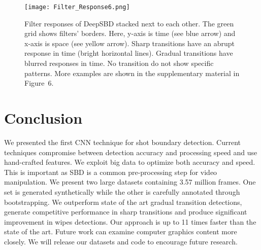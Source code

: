 \documentclass[journal]{IEEEtran}
\begin{document}
\begin{figure}
  \centering
   \texttt{[image: Filter\_Response6.png]}
   \caption{Filter responses of DeepSBD stacked next to each other. The green grid shows filters' borders. Here, y-axis is time (see blue arrow) and x-axis is space (see yellow arrow). Sharp transitions have an abrupt response in time (bright horizontal lines). Gradual transitions have blurred responses in time. No transition do not show specific patterns. More examples are shown in the supplementary material in Figure~6.}
\label{fig:FilterResponses}
 \end{figure}

\section{Conclusion}

We presented the first CNN technique for shot boundary detection. Current techniques compromise between detection accuracy and processing speed and use hand-crafted features. We exploit big data to optimize both accuracy and speed. This is important as SBD is a common pre-processing step for video manipulation. We present two large datasets containing 3.57 million frames. One set is generated synthetically while the other is carefully annotated through bootstrapping. We outperform state of the art gradual transition detections, generate competitive performance in sharp transitions and produce significant improvement in wipes detections. Our approach is up to 11 times faster than the state of the art. Future work can examine computer graphics content more closely. We will release our datasets and code to encourage future research. 








\ifCLASSOPTIONcaptionsoff
  \newpage
\fi















{


}
\end{document}
